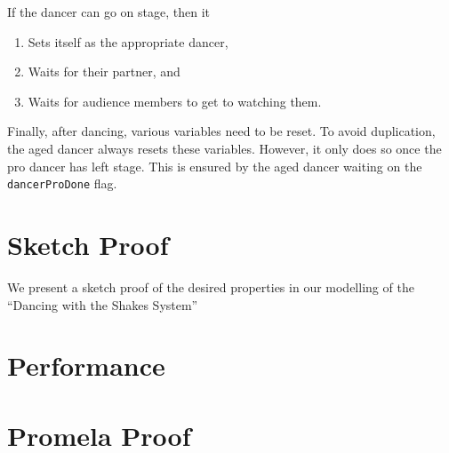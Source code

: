 \documentclass[12pt,a4paper]{scrartcl}
\begin{document}
If the dancer can go on stage, then it
\begin{enumerate}
    \item Sets itself as the appropriate dancer,
    \item Waits for their partner, and 
    \item Waits for audience members to get to watching them.
\end{enumerate}

Finally, after dancing, various variables need to be reset.
To avoid duplication, the aged dancer always resets these variables.
However, it only does so once the pro dancer has left stage.
This is ensured by the aged dancer waiting on the \texttt{dancerProDone} flag.

\section{Sketch Proof}
We present a sketch proof of the desired properties in our modelling of the ``Dancing with the Shakes System''

\section{Performance}

\section{Promela Proof}
\end{document}
